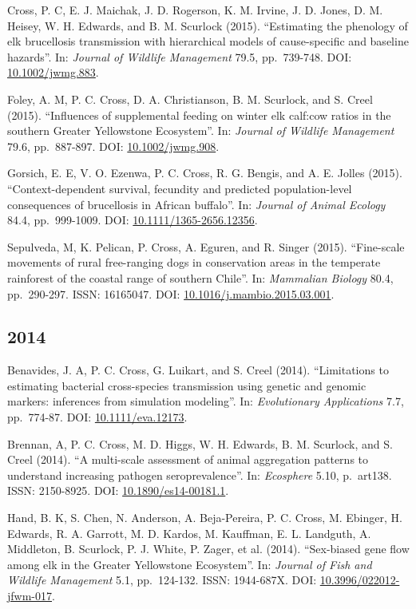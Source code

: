 \documentclass[12pt,]{article}
\begin{document}
Cross, P. C, E. J. Maichak, J. D. Rogerson, K. M. Irvine, J. D. Jones,
D. M. Heisey, W. H. Edwards, and B. M. Scurlock (2015). ``Estimating the
phenology of elk brucellosis transmission with hierarchical models of
cause-specific and baseline hazards''. In: \emph{Journal of Wildlife
Management} 79.5, pp.~739-748. DOI:
\href{https://doi.org/10.1002\%2Fjwmg.883}{10.1002/jwmg.883}.

Foley, A. M, P. C. Cross, D. A. Christianson, B. M. Scurlock, and S.
Creel (2015). ``Influences of supplemental feeding on winter elk
calf:cow ratios in the southern Greater Yellowstone Ecosystem''. In:
\emph{Journal of Wildlife Management} 79.6, pp.~887-897. DOI:
\href{https://doi.org/10.1002\%2Fjwmg.908}{10.1002/jwmg.908}.

Gorsich, E. E, V. O. Ezenwa, P. C. Cross, R. G. Bengis, and A. E. Jolles
(2015). ``Context-dependent survival, fecundity and predicted
population-level consequences of brucellosis in African buffalo''. In:
\emph{Journal of Animal Ecology} 84.4, pp.~999-1009. DOI:
\href{https://doi.org/10.1111\%2F1365-2656.12356}{10.1111/1365-2656.12356}.

Sepulveda, M, K. Pelican, P. Cross, A. Eguren, and R. Singer (2015).
``Fine-scale movements of rural free-ranging dogs in conservation areas
in the temperate rainforest of the coastal range of southern Chile''.
In: \emph{Mammalian Biology} 80.4, pp.~290-297. ISSN: 16165047. DOI:
\href{https://doi.org/10.1016\%2Fj.mambio.2015.03.001}{10.1016/j.mambio.2015.03.001}.

\hypertarget{section-5}{%
\subsection{2014}\label{section-5}}

Benavides, J. A, P. C. Cross, G. Luikart, and S. Creel (2014).
``Limitations to estimating bacterial cross-species transmission using
genetic and genomic markers: inferences from simulation modeling''. In:
\emph{Evolutionary Applications} 7.7, pp.~774-87. DOI:
\href{https://doi.org/10.1111\%2Feva.12173}{10.1111/eva.12173}.

Brennan, A, P. C. Cross, M. D. Higgs, W. H. Edwards, B. M. Scurlock, and
S. Creel (2014). ``A multi-scale assessment of animal aggregation
patterns to understand increasing pathogen seroprevalence''. In:
\emph{Ecosphere} 5.10, p.~art138. ISSN: 2150-8925. DOI:
\href{https://doi.org/10.1890\%2Fes14-00181.1}{10.1890/es14-00181.1}.

Hand, B. K, S. Chen, N. Anderson, A. Beja-Pereira, P. C. Cross, M.
Ebinger, H. Edwards, R. A. Garrott, M. D. Kardos, M. Kauffman, E. L.
Landguth, A. Middleton, B. Scurlock, P. J. White, P. Zager, et al.
(2014). ``Sex-biased gene flow among elk in the Greater Yellowstone
Ecosystem''. In: \emph{Journal of Fish and Wildlife Management} 5.1,
pp.~124-132. ISSN: 1944-687X. DOI:
\href{https://doi.org/10.3996\%2F022012-jfwm-017}{10.3996/022012-jfwm-017}.
\end{document}

